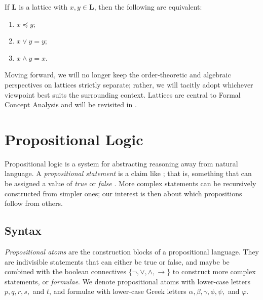 \begin{lemma}
  \label{lemma:the-connecting-lemma}
  If $\mathbf{L}$ is a lattice with $x, y \in \mathbf{L}$, then the following are equivalent:
  \begin{enumerate}
      \setlength\itemsep{0pt}
      \setlength\parsep{0pt}
    \item $x \preceq y$;
    \item $x \vee y = y$;
    \item $x \wedge y = x$.
  \end{enumerate}
\end{lemma}

Moving forward, we will no longer keep the order‑theoretic and algebraic perspectives on lattices strictly separate; rather, we will tacitly adopt whichever viewpoint best suits the surrounding context. Lattices are central to Formal Concept Analysis and will be revisited in .

\section{Propositional Logic}
\label{section:propositional-logic}

Propositional logic is a system for abstracting reasoning away from natural language. A \textit{propositional statement} is a claim like ; that is, something that can be assigned a value of \textit{true} or \textit{false} \cite[p. 7]{Ben1993Mathematical}. More complex statements can be recursively constructed from simpler ones; our interest is then about which propositions follow from others. 

\subsection{Syntax}
\label{subsection:syntax}
       
\textit{Propositional atoms} are the construction blocks of a propositional language. They are indivisible statements that can either be true or false, and maybe be combined with the boolean connectives $\{\neg, \lor, \land, \rightarrow\}$ to construct more complex statements, or \textit{formulae}. We denote propositional atoms with lower-case letters $p,q,r,s,$ and $t$, and formulae with lower-case Greek letters $\alpha, \beta, \gamma, \phi, \psi,$ and $\varphi$. 

